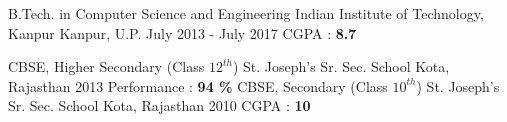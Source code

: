 
\begin{cventries}

  \cventry
    {B.Tech. in Computer Science and Engineering} %
    {Indian Institute of Technology, Kanpur} %
    {Kanpur, U.P.} %
    {July 2013 - July 2017} %
    {
    	CGPA : \textbf{8.7}
    }
    
   \cventry
       {CBSE, Higher Secondary (Class $12^{th}$)} %
       {St. Joseph's Sr. Sec. School} %
       {Kota, Rajasthan} %
       {2013} %
       {
       	 Performance : \textbf{94 \%}
       }
	\cventry
	{CBSE, Secondary (Class $10^{th}$)} %
	{St. Joseph's Sr. Sec. School} %
	{Kota, Rajasthan} %
	{2010} %
	{
		CGPA : \textbf{10}
	}
\end{cventries}
